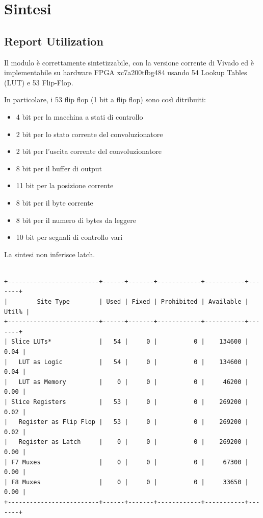 \documentclass[12pt, a4paper]{article}
\begin{document}
\pagebreak

\section{Sintesi}

\subsection{Report Utilization}

Il modulo è correttamente sintetizzabile, con la versione corrente di Vivado ed è implementabile su hardware FPGA
xc7a200tfbg484 usando 54 Lookup Tables (LUT) e 53 Flip-Flop.

\noindent In particolare, i 53 flip flop (1 bit a flip flop) sono così ditribuiti:
\begin{itemize}[itemsep=4pt, topsep=4pt]
    \item 4 bit per la macchina a stati di controllo
    \item 2 bit per lo stato corrente del convoluzionatore
    \item 2 bit per l'uscita corrente del convoluzionatore
    \item 8 bit per il buffer di output
    \item 11 bit per la posizione corrente
    \item 8 bit per il byte corrente
    \item 8 bit per il numero di bytes da leggere
    \item 10 bit per segnali di controllo vari
\end{itemize}

\noindent La sintesi non inferisce latch.

\begin{verbatim}

+-------------------------+------+-------+------------+-----------+-------+
|        Site Type        | Used | Fixed | Prohibited | Available | Util% |
+-------------------------+------+-------+------------+-----------+-------+
| Slice LUTs*             |   54 |     0 |          0 |    134600 |  0.04 |
|   LUT as Logic          |   54 |     0 |          0 |    134600 |  0.04 |
|   LUT as Memory         |    0 |     0 |          0 |     46200 |  0.00 |
| Slice Registers         |   53 |     0 |          0 |    269200 |  0.02 |
|   Register as Flip Flop |   53 |     0 |          0 |    269200 |  0.02 |
|   Register as Latch     |    0 |     0 |          0 |    269200 |  0.00 |
| F7 Muxes                |    0 |     0 |          0 |     67300 |  0.00 |
| F8 Muxes                |    0 |     0 |          0 |     33650 |  0.00 |
+-------------------------+------+-------+------------+-----------+-------+

\end{verbatim}
\end{document}

